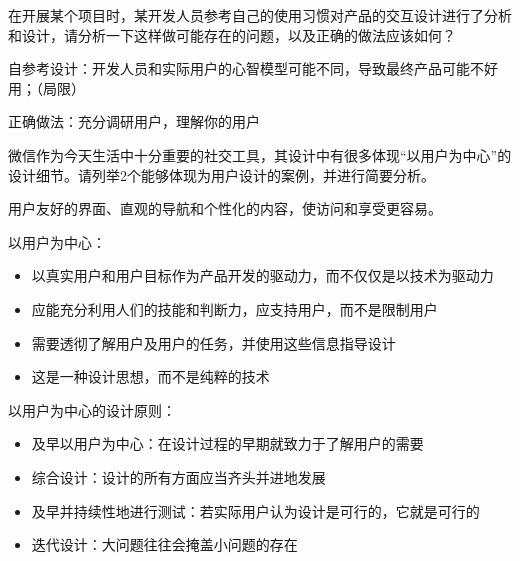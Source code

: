 \begin{problem}[2022]
在开展某个项目时，某开发人员参考自己的使用习惯对产品的交互设计进行了分析和设计，请分析一下这样做可能存在的问题，以及正确的做法应该如何？
\end{problem}

\begin{solution}
自参考设计：开发人员和实际用户的心智模型可能不同，导致最终产品可能不好用；（局限）

正确做法：充分调研用户，理解你的用户
\end{solution}



\begin{problem}[2022]
微信作为今天生活中十分重要的社交工具，其设计中有很多体现“以用户为中心”的设计细节。请列举2个能够体现为用户设计的案例，并进行简要分析。
\end{problem}

\begin{solution}
用户友好的界面、直观的导航和个性化的内容，使访问和享受更容易。

以用户为中心：
\begin{itemize}
    \item 以真实用户和用户目标作为产品开发的驱动力，而不仅仅是以技术为驱动力
    \item 应能充分利用人们的技能和判断力，应支持用户，而不是限制用户
    \item 需要透彻了解用户及用户的任务，并使用这些信息指导设计
    \item 这是一种设计思想，而不是纯粹的技术
\end{itemize}

以用户为中心的设计原则：
\begin{itemize}
    \item 及早以用户为中心：在设计过程的早期就致力于了解用户的需要
    \item 综合设计：设计的所有方面应当齐头并进地发展
    \item 及早并持续性地进行测试：若实际用户认为设计是可行的，它就是可行的
    \item 迭代设计：大问题往往会掩盖小问题的存在
\end{itemize}
\end{solution}



